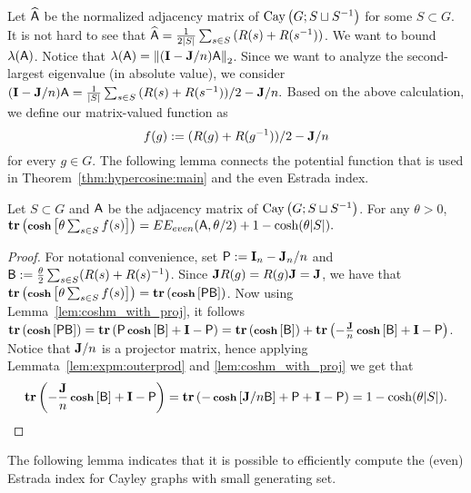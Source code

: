 %
%
Let $\widehat{\matA}$ be the normalized adjacency matrix of $\Cay{G}{S\sqcup S^{-1}}$ for some $S\subset G$. It is not hard to see that $ \widehat{\matA} = \frac1{2|S|} \sum_{s\in S}{ (R(s) + R(s^{-1}))}$. We want to bound $\lambda (\matA)$. Notice that $\lambda(\matA)=\norm{(\Id - \J/n) \matA}$. Since we want to analyze the second-largest eigenvalue (in absolute value), we consider $(\Id - \J/n)\matA = \frac1{|S|} \sum_{s\in S}{ (R(s) + R(s^{-1})) /2} - \J/n.$
Based on the above calculation, we define our matrix-valued function as
\begin{equation}\label{eq:AR:samplesnew}
f(g) := (R(g) + R(g^{-1})) / 2 - \J /n
\end{equation}
for every $g\in G$. The following lemma connects the potential function that is used in Theorem~\ref{thm:hypercosine:main} and the even Estrada index.
%
\begin{lemma}\label{lem:cosh_Estrada}
Let $S\subset G $ and $\matA$ be the adjacency matrix of $\Cay{G}{S\sqcup S^{-1}}$. For any $\theta>0$, $\trace{ \coshm{ \theta \sum_{s\in S} f(s) } } = EE_{even} (\matA,\theta/2)  + 1 - \cosh(\theta |S|).$
\end{lemma}
\begin{proof}
For notational convenience, set $\matP:= \Id_n - \J_n/n$ and $\matB := \frac{\theta}{2} \sum_{s\in S} (R(s) + R(s)^{-1})  $. Since $\J R(g) = R(g) \J = \J$, we have that $\trace{ \coshm{ \theta \sum_{s\in S} f(s) } } = \trace{ \coshm{ \matP \matB }}$. Now using Lemma~\ref{lem:coshm_with_proj}, it follows $\trace{ \coshm{ \matP \matB }} = \trace{\matP \coshm{\matB} + \Id - \matP} = \trace{\coshm{\matB}} + \trace{-\frac{\J}{n} \coshm{\matB} + \Id - \matP}$. Notice that $\J/n$ is a projector matrix, hence applying Lemmata~\ref{lem:expm:outerprod} and \ref{lem:coshm_with_proj} we get that
%
\[\trace{-\frac{\J}{n} \coshm{\matB} + \Id - \matP} = \trace{-\coshm{\J/n \matB} + \matP +\Id - \matP} = 1 - \cosh(\theta |S|).\]
%
\end{proof}
%
The following lemma indicates that it is possible to efficiently compute the (even) Estrada index for Cayley graphs with small generating set.

